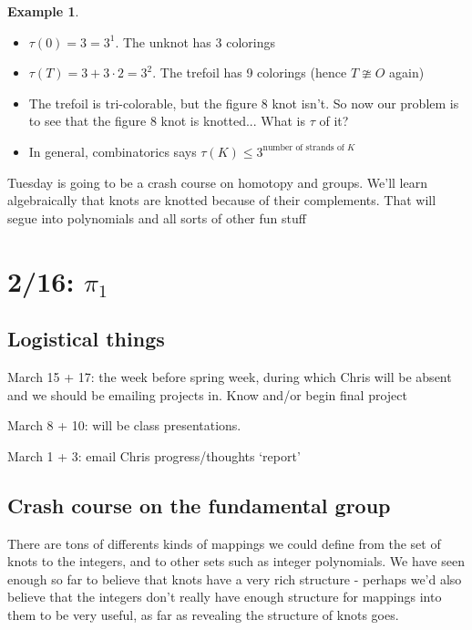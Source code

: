 \documentclass[11pt]{article}
\theoremstyle{plain}
\theoremstyle{definition}
\newtheorem{ex}{Example}
\begin{document}
\begin{ex}

  \begin{itemize}
  \item $\tau(0) = 3 = 3^1$. The unknot has 3 colorings
  \item $\tau(T) = 3 + 3 \cdot 2 = 3^2$. The trefoil has 9 colorings (hence $T\ncong O$ again)
  \item The trefoil is tri-colorable, but the figure 8 knot isn't. So now our problem is to see that the figure 8 knot is knotted... What is $\tau$ of it?
  \item In general, combinatorics says $\tau(K) \leq 3^{\text{number of strands of } K}$
  \end{itemize}

\end{ex}

Tuesday is going to be a crash course on homotopy and groups. We'll learn algebraically that knots are
knotted because of their complements. That will segue into polynomials and all sorts of other fun stuff


\clearpage
\section{2/16: $\pi_1$}

\subsection{Logistical things}

March 15 + 17: the week before spring week, during which Chris will be absent and we should be emailing projects in. Know and/or begin final project

March 8 + 10: will be class presentations.

March 1 + 3: email Chris progress/thoughts `report'

\subsection{Crash course on the fundamental group}

There are tons of differents kinds of mappings we could define from the set of knots to the integers, and to other sets such as integer polynomials. We have seen enough so far
to believe that knots have a very rich structure  - perhaps we'd also believe that the integers don't really have enough structure for mappings into them to be very useful,
as far as revealing the structure of knots goes.
\end{document}
